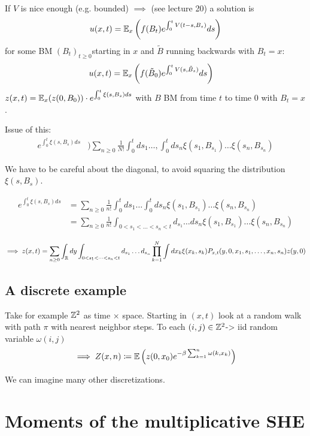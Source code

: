 If $V$ is nice enough (e.g. bounded) $\implies$ (see lecture 20) a solution is 
\[u(x,t)=\mathbb{E}_x\left(f(B_t)e^{\int_0^t V(t-s,B_s)}ds\right)\]
for some BM $(B_t)_{t\geq 0}$starting in $x$ and $\tilde{B}$ running backwards with $B_t=x$:
\begin{align*}
    u(x,t)&=\mathbb{E}_x\left(f(\tilde{B}_0)e^{\int_0^t V(s,\tilde{B}_s)}ds\right)
\end{align*}
 $z(x,t)=\mathbb{E}_x(z(0,B_0))\cdot e^{\int_0^t \xi(s,B_s)ds}$ with $B$ BM from time $t$ to time $0$ with $B_t=x$.

Issue of this: 
\begin{align*}
    e^{\int_0^t\xi(s,B_s)ds}&)\sum_{n\geq 0}\frac{1}{N!}\int_0^tds_1\dots,\int_0^t ds_n\xi(s_1,B_{s_1})\dots\xi(s_n,B_{s_n})
\end{align*}

We have to be careful about the diagonal, to avoid squaring the distribution $\xi(s,B_s)$.


\begin{align*}
    e^{\int_0^t\xi(s,B_s)ds}&=\sum_{n\geq 0}\frac{1}{n!}\int_0^tds_1\dots\int_0^t ds_n\xi(s_1,B_{s_1})\dots\xi(s_n,B_{s_n})\\
    &=\sum_{n\geq 0}\frac{1}{n!}\int_{0<s_1<\dots<s_n<t}d_{s_1}\dots ds_n\xi(s_1,B_{s_1})\dots\xi(s_n,B_{s_n})
\end{align*}

\begin{align*}
    \implies z(x,t)=\sum_{n\geq 0}\int_{\mathbb{R}} dy \int_{0<s_1<\dots< s_n<t}d_{s_1}\dots d_{s_n}\prod_{k=1}^N \int dx_k\xi(x_k,s_k)P_{x,t}(y,0,x_1,s_1,\dots,x_n,s_n)z(y,0)
\end{align*}

\subsection{A discrete example}

Take for example $\mathbb{Z}^2$ as time $\times $ space. Starting in $(x,t)$ 
look at a random walk with path $\pi$ with nearest neighbor steps. To each $(i,j)\in \mathbb{Z}^2$-> iid random variable $\omega(i,j)$
\[\implies Z(x,n)\coloneqq \mathbb{E}\left(z(0,x_0)e^{-\beta\sum_{k=1}^n \omega(k,x_k)}\right)\]

We can imagine many other discretizations.

\section{Moments of the multiplicative SHE}

